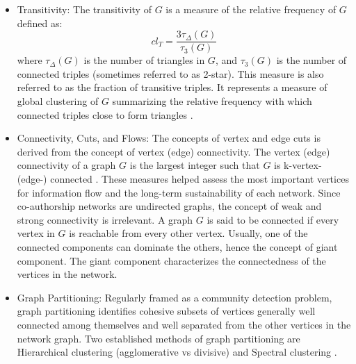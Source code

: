 \begin{itemize}
\item Transitivity: The transitivity of $G$ is a measure of the relative frequency of $G$ defined as: 
\begin{equation} 
cl_T = \frac{3\tau_\Delta (G)}{\tau_3 (G)} 
\end{equation}
where $\tau_\Delta (G)$ is the number of triangles in $G$, and $\tau_3 (G)$ is the number of connected triples (sometimes referred to as 2-star). This measure is also referred to as the fraction of transitive triples. It represents a measure of global clustering of $G$ summarizing the relative frequency with which connected triples close to form triangles \cite{kolaczyk_statistical_2014}.
\item Connectivity, Cuts, and Flows: The concepts of vertex and edge cuts is derived from the concept of vertex (edge) connectivity. The vertex (edge) connectivity of a graph $G$ is the largest integer such that $G$ is k-vertex- (edge-) connected \cite{kolaczyk_statistical_2014}. These measures helped assess the most important vertices for information flow and the long-term sustainability of each network. Since co-authorship networks are undirected graphs, the concept of weak and strong connectivity is irrelevant. A graph $G$ is said to be connected if every vertex in $G$ is reachable from every other vertex. Usually, one of the connected components can dominate the others, hence the concept of giant component. The giant component characterizes the connectedness of the vertices in the network. 
\item Graph Partitioning: Regularly framed as a community detection problem, %
graph partitioning identifies cohesive subsets of vertices generally well connected among themselves and well separated from the other vertices in the network graph. Two established methods of graph partitioning are Hierarchical clustering (agglomerative vs divisive) and Spectral clustering \cite{kolaczyk_statistical_2014}. %
\end{itemize}

